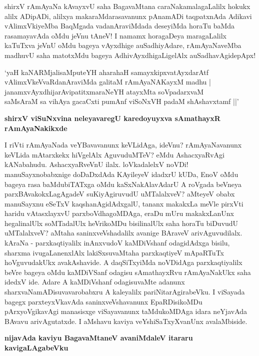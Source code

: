 \noindent
shirxV rAmAyaNa kAvayxvU saha BagavaMtana caraNakamalagaLalilx hokukx alilx ADi\-pADi, alilxya maka\-raMdarasavanunx pAnamADi taqpatxnAda Adikavi vAlimxVkiyeMba BaqMgada vadanAraviMdada deseyiMda hora\-Tu baMda rasamayavAda oMdu jeVnu tAneV! I namamx horagaDeya maragaLalilx kaTuTxva jeVnU oMdu bageya vAyxdhige auSadhiyAdare, rAmAyaNaveMba madhuvU saha matotxMdu bageya AdhivAyxdhigaLi\-gelAlx auSadhavAgidepApx!

\begin{shloka}
`yaH kaNARMjalisaMputeYH aharahaH samayxkipxvatAyxdarAtf\\\label{238}
vAlimxVkeVvaRdanAraviMda galitaM rAmAyaNAKayxM madhu |\\
janamxvAyxdhijarAvipatitxmaraNeYH atayxMta soVpadarxvaM \\
saMsAraM sa vihAya gacaCxti pumAnf viSoNxVH padaM shAshavxtamf ||'
\end{shloka}

{\bigskip
\noindent
{\large\bf shirxV viSuNxvina neleyavaregU karedoyuyxva sAmathayxR rAmAyaNakikxde}}\label{page238}
\medskip

\noindent
I riVti rAmAyaNada veYBavavanunx keVLidAga, ideVnu? rAmAyaNavanunx keVLida mAtarxkekx hiV\-gelAlx AguvuduMTeV? eMdu AshacxyaRvAgi kANabahudu. AshacxyaRveVnU ilalx. loVka\-dalelxV\- noVDi! manu\-Sayxnobabxnige doDaDxdAda KAyileyeV idadxrU kUDa, EnoV oMdu bageya rasa baMdubi\-TATxga oMdu kaSxNakAlavAdarU A roVgada beVneya parxBAvakokxLagAgadeV suKiyAgiru\-vudU uMTa\-lalxveV? aMteyeV obabx manuSayxnu eSeTxV kaqshanAgidAdxgalU, tananx makakxLa meVle pirxVti haridu vAtasxlayxvU parxboVdhagoMDAga, eraDu mUru makakxLanUnx hegalinalUlx soMTadalUlx heVrikoMDu bisilinalUlx saha horaTu biDuvudU uMTalalxveV? aMtaha saninxveVshadalilx avanige BAraveV arivAguvudilalx. kAraNa \-- parxkaqtiyalilx inAnxvudoV kaMDiVshanf odagidAdxga bisilu, sharxma ivugaLanenxlAlx lakiSxsuvaMtaha parxkaqtiyeV mApaRTuTx hoVguvudakUkx avakAshavide. A daqSiTxyiMda noVDidAga parxkaqtiyalilx beVre bageya oMdu kaMDiVSanf odagisu sAmathayxRvu rAmAyaNakUkx saha idedxV ide. Adare A kaMDiVshanf odagisuvaMte adanunx sharxvaNamADisuvavarobabxru A kaleyalilx pariNitarAgirabeVku. I viSayada bagegx parxteyxVkavAda saninxveVshavanunx EpaRDisikoMDu pArxyoVgikavAgi manasisxge viSayavanunx taMdukoMDAga idara neYja\-vAda BAvavu arivAgutatxde. I aMshavu kaviya veYshiSaTxyXvanUnx avalaMbiside.

\newpage
{\noindent
{\large\bf nijavAda kaviyu BagavaMtaneV avaniMdaleV itararu kavigaLAgabeVku}}\label{page239}
\medskip

